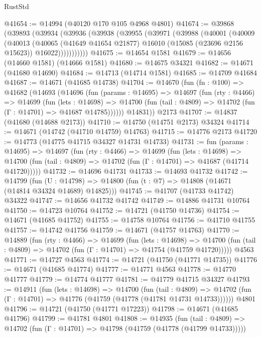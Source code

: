 \begin{lexlean}{RustStd}
\begin{coremodule}
@41654 := @14994 (@40120 @170 @105 @4968 @4801)
@41674 := @39868
    (@39893
      (@39934
        (@39936
          (@39938
            (@39955
              (@39971
                (@39988
                  (@40001
                    (@40009
                      (@40013
                        (@40065
                          (@41649 @41654 @21877)
                          @16010
                          (@15085 (@23696 @2156 @15623))
                          @16022)))))))))))
@41675 := @14654 @1581
@41679 := @14656 (@14660 @1581) (@14666 @1581)
@41680 := @14675 @34321
@41682 := @14671 (@41680 @14690)
@41684 := @14713 (@14714 @1581)
@41685 := @14709 @41684
@41687 := @14671 (@41685 @14738)
@41704 := @14670
    (fun (fn : @100) =>
    @41682
      (@14693
        (@14696
          (fun (params : @14695) =>
          @14697
            (fun (rty : @4466) =>
            @14699
              (fun (lets : @14698) =>
              @14700 (fun (tail : @4809) => @14702 (fun (Γ : @14701) => @41687 @14785))))))
        @14831))
    @2173
@41707 := @14837 (@41680 (@14688 @2173))
@41710 := @14750 (@14751 @2173) @34324
@41714 := @14671 (@14742 (@41710 @14759) @14763)
@41715 := @14776 @2173
@41720 := @14773 (@14775 @41715 @34327 @14731 @14733)
@41731 := fun (params : @14695) =>
  @14697
    (fun (rty : @4466) =>
    @14699
      (fun (lets : @14698) =>
      @14700 (fun (tail : @4809) => @14702 (fun (Γ : @14701) => @41687 (@41714 @41720)))))
@41732 := @14696 @41731
@41733 := @14693 @41732
@41742 := @14799
    (fun (U : @14798) => @14800 (fun (t : @7) => @14808 (@14671 (@14814 @34324 @14689) @14825)))
@41745 := @41707 (@41733 @41742) @34322
@41747 := @14656 @41732 @41742
@41749 := @14886 @41731 @10764
@41750 := @14723 @10764
@41752 := @14721 (@41750 @14736)
@41754 := @14671 (@41685 @41752)
@41755 := @14758 @10764
@41756 := @41710 @41755
@41757 := @14742 @41756
@41759 := @14671 (@41757 @14763)
@41770 := @14889
    (fun (rty : @4466) =>
    @14699
      (fun (lets : @14698) =>
      @14700 (fun (tail : @4809) => @14702 (fun (Γ : @14701) => @41754 (@41759 @41720)))))
    @4563
@41771 := @14727 @4563
@41774 := @14721 (@41750 (@41771 @14735))
@41776 := @14671 (@41685 @41774)
@41777 := @14771 @4563
@41778 := @14770 @41777
@41779 := @14774 @41777
@41781 := @41779 @41715 @34327
@41793 := @14911
    (fun (lets : @14698) =>
    @14700
      (fun (tail : @4809) =>
      @14702 (fun (Γ : @14701) => @41776 (@41759 (@41778 (@41781 @14731 @14733))))))
    @4801
@41796 := @14721 (@41750 (@41771 @17223))
@41798 := @14671 (@41685 @41796)
@41799 := @41781 @4801
@41808 := @14935
    (fun (tail : @4809) => @14702 (fun (Γ : @14701) => @41798 (@41759 (@41778 (@41799 @14733)))))

\end{coremodule}
\end{lexlean}

